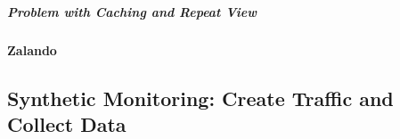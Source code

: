 



\subparagraph{Problem with Caching and Repeat View}






\paragraph{Zalando}











\subsection{Synthetic Monitoring: Create Traffic and Collect Data}


